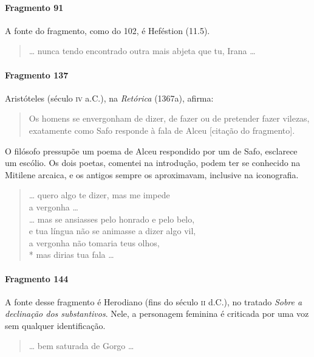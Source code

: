 \paragraph{Fragmento 91}

{\small A fonte do fragmento, como do 102, é Heféstion (11.5).}

\begin{verse}
\ldots{} nunca tendo encontrado outra mais \qb{}abjeta que tu, Irana \ldots{}
\end{verse}

\paragraph{Fragmento 137}

{\small Aristóteles (século \textsc{iv} a.C.), na \textit{Retórica} (1367a), afirma: 

\begin{quote}
Os homens se envergonham de dizer, de fazer ou de pretender fazer vilezas, exatamente
como Safo responde à fala de Alceu [citação do fragmento].
\end{quote}

O filósofo pressupõe um poema de Alceu respondido por um de Safo, esclarece um escólio. Os
dois poetas, comentei na introdução, podem ter se conhecido na Mitilene arcaica, e
os antigos sempre os aproximavam, inclusive na iconografia. }

\begin{verse}
\ldots{} quero algo te dizer, mas me impede\\
a vergonha \ldots{}\\
\ldots{} mas se ansiasses pelo honrado e pelo belo,\\
e tua língua não se animasse a dizer algo vil,\\
a vergonha não tomaria teus olhos,\\*
mas dirias tua fala \ldots{}
\end{verse}

\paragraph{Fragmento 144}

{\small A fonte desse fragmento é Herodiano (fins do século \textsc{ii} d.C.), no tratado
\textit{Sobre a declinação dos substantivos}. Nele, a personagem feminina é
criticada por uma voz sem qualquer identificação.}

\begin{verse}
\ldots{} bem saturada de Gorgo \ldots{}
\end{verse}

